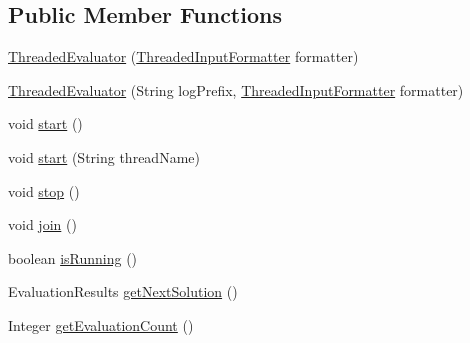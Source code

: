 \subsection*{Public Member Functions}
\begin{DoxyCompactItemize}
\item 
\hyperlink{classit_1_1emarolab_1_1cagg_1_1core_1_1evaluation_1_1ThreadedEvaluator_aab89da5e90e402626b6c0c9bcd5ce69f}{Threaded\-Evaluator} (\hyperlink{classit_1_1emarolab_1_1cagg_1_1core_1_1evaluation_1_1inputFormatting_1_1ThreadedInputFormatter}{Threaded\-Input\-Formatter} formatter)
\item 
\hyperlink{classit_1_1emarolab_1_1cagg_1_1core_1_1evaluation_1_1ThreadedEvaluator_a50b0926f9833fef478d035d9d58b7a88}{Threaded\-Evaluator} (String log\-Prefix, \hyperlink{classit_1_1emarolab_1_1cagg_1_1core_1_1evaluation_1_1inputFormatting_1_1ThreadedInputFormatter}{Threaded\-Input\-Formatter} formatter)
\item 
void \hyperlink{classit_1_1emarolab_1_1cagg_1_1core_1_1evaluation_1_1ThreadedEvaluator_a3c36a3bcac3a93eb0379a840c149e038}{start} ()
\item 
void \hyperlink{classit_1_1emarolab_1_1cagg_1_1core_1_1evaluation_1_1ThreadedEvaluator_a0ee9dee406f28462037c35663cf0ecf3}{start} (String thread\-Name)
\item 
void \hyperlink{classit_1_1emarolab_1_1cagg_1_1core_1_1evaluation_1_1ThreadedEvaluator_af7473481721215903da926475b5cac88}{stop} ()
\item 
void \hyperlink{classit_1_1emarolab_1_1cagg_1_1core_1_1evaluation_1_1ThreadedEvaluator_a0afb0c32cb7931ef7dcd7bb93714d84c}{join} ()
\item 
boolean \hyperlink{classit_1_1emarolab_1_1cagg_1_1core_1_1evaluation_1_1ThreadedEvaluator_a4b18781b0e94720e43f06817fc6cb1a7}{is\-Running} ()
\item 
Evaluation\-Results \hyperlink{classit_1_1emarolab_1_1cagg_1_1core_1_1evaluation_1_1ThreadedEvaluator_a760cd197b4dd73823616c1926c296586}{get\-Next\-Solution} ()
\item 
Integer \hyperlink{classit_1_1emarolab_1_1cagg_1_1core_1_1evaluation_1_1ThreadedEvaluator_aa6df23a4635a07fe7014a130c48475d4}{get\-Evaluation\-Count} ()
\end{DoxyCompactItemize}

